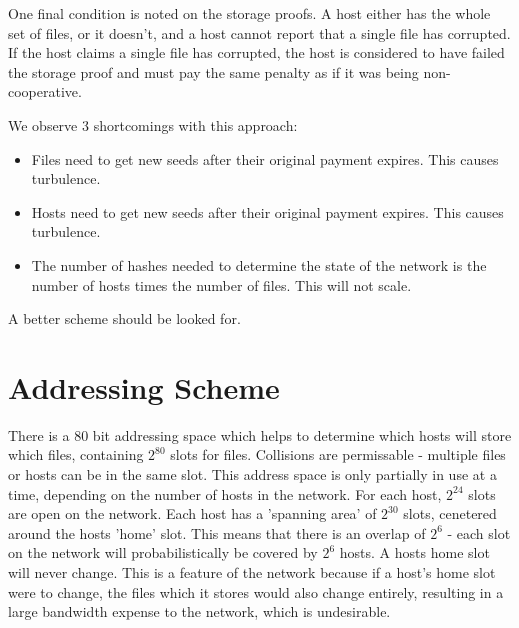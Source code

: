 \documentclass[twocolumn]{article}
\begin{document}
One final condition is noted on the storage proofs.
A host either has the whole set of files, or it doesn't, and a host cannot report that a single file has corrupted.
If the host claims a single file has corrupted, the host is considered to have failed the storage proof and must pay the same penalty as if it was being non-cooperative.

We observe 3 shortcomings with this approach:
\begin{itemize}
	\item Files need to get new seeds after their original payment expires. This causes turbulence.
	\item Hosts need to get new seeds after their original payment expires. This causes turbulence.
	\item The number of hashes needed to determine the state of the network is the number of hosts times the number of files. This will not scale.
\end{itemize}
A better scheme should be looked for.

\section{Addressing Scheme}
There is a 80 bit addressing space which helps to determine which hosts will store which files, containing $2^{80}$ slots for files.
Collisions are permissable - multiple files or hosts can be in the same slot.
This address space is only partially in use at a time, depending on the number of hosts in the network. For each host, $2^{24}$ slots are open on the network.
Each host has a 'spanning area' of $2^{30}$ slots, cenetered around the hosts 'home' slot. This means that there is an overlap of $2^6$ - each slot on the network will probabilistically be covered by $2^6$ hosts.
A hosts home slot will never change.
This is a feature of the network because if a host's home slot were to change, the files which it stores would also change entirely, resulting in a large bandwidth expense to the network, which is undesirable.
\end{document}
